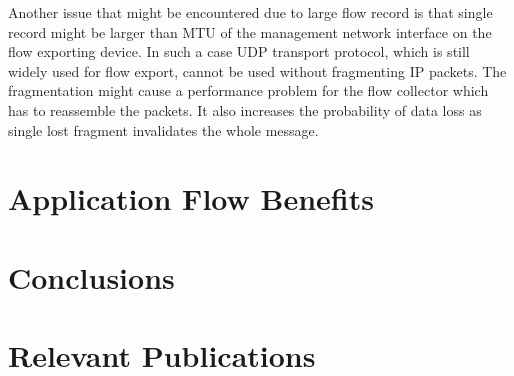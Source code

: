 Another issue that might be encountered due to large flow record is that single record might be larger than MTU of the management network interface on the flow exporting device. In such a case UDP transport protocol, which is still widely used for flow export, cannot be used without fragmenting IP packets. The fragmentation might cause a performance problem for the flow collector which has to reassemble the packets. It also increases the probability of data loss as single lost fragment invalidates the whole message.

\section{Application Flow Benefits}


\section{Conclusions}

\section{Relevant Publications}
